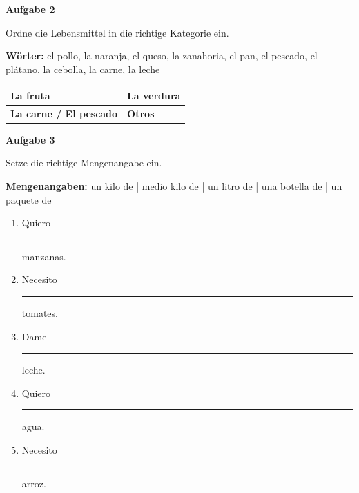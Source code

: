\documentclass[11pt, a4paper]{article}
\newcommand{\fachfarbe}{spanisch}
\newcommand{\punktebox}[1]{\hfill\fbox{\small \_/#1}}
\newcommand{\luecke}[1]{\rule{#1}{0.4pt}}
\newenvironment{aufgabe}[1]{%
    \needspace{5\baselineskip}%
    \nopagebreak[4]%
    \vspace{10pt}
    \noindent\textbf{\textcolor{\fachfarbe}{Aufgabe #1}}
    \nopagebreak[4]%
    \vspace{5pt}
    \nopagebreak[4]%
    \begin{list}{}{\leftmargin=0pt}
    \item[]
}{%
    \end{list}
}
\begin{document}
\vspace{15pt}


\begin{aufgabe}{2}
Ordne die Lebensmittel in die richtige Kategorie ein. \punktebox{6}
\end{aufgabe}

\begin{hinweis}
\textbf{Wörter:} el pollo, la naranja, el queso, la zanahoria, el pan, el pescado, el plátano, la cebolla, la carne, la leche
\end{hinweis}

\vspace{0.5em}

\begin{tabularx}{\textwidth}{|X|X|}
\hline
\textbf{La fruta} & \textbf{La verdura} \\[2.5em]
\hline
\textbf{La carne / El pescado} & \textbf{Otros} \\[2.5em]
\hline
\end{tabularx}

\vspace{15pt}


\begin{aufgabe}{3}
Setze die richtige Mengenangabe ein. \punktebox{5}
\end{aufgabe}

\begin{hinweis}
\textbf{Mengenangaben:} un kilo de | medio kilo de | un litro de | una botella de | un paquete de
\end{hinweis}

\vspace{0.5em}

\begin{enumerate}[label=\alph*)]
    \item Quiero \luecke{3.5cm} manzanas.
    \item Necesito \luecke{3.5cm} tomates.
    \item Dame \luecke{3.5cm} leche.
    \item Quiero \luecke{3.5cm} agua.
    \item Necesito \luecke{3.5cm} arroz.
\end{enumerate}
\end{document}
